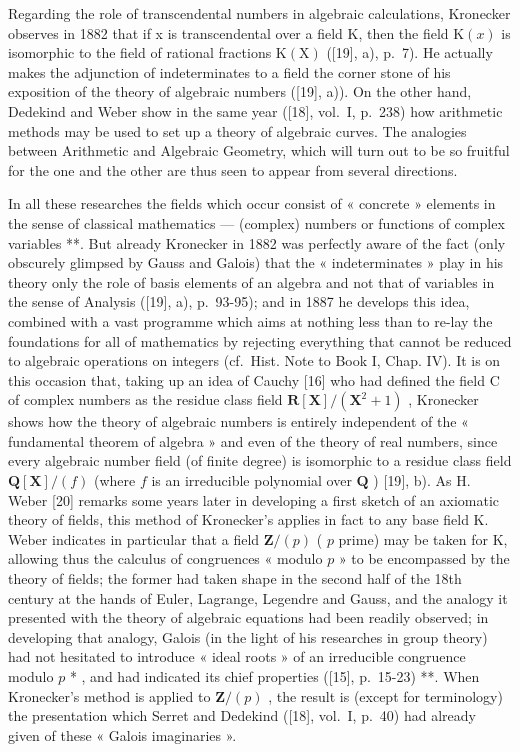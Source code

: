 Regarding the role of transcendental numbers in algebraic calculations, Kronecker observes in 1882 that if x is transcendental over a field K, then the field \(\mathrm{K}(x)\) is isomorphic to the field of rational fractions \(\mathrm{K}(\mathrm{X})\) ({[}19{]}, a), p.~7). He actually makes the adjunction of indeterminates to a field the corner stone of his exposition of the theory of algebraic numbers ({[}19{]}, a)). On the other hand, Dedekind and Weber show in the same year ({[}18{]}, vol.~I, p.~238) how arithmetic methods may be used to set up a theory of algebraic curves. The analogies between Arithmetic and Algebraic Geometry, which will turn out to be so fruitful for the one and the other are thus seen to appear from several directions.

In all these researches the fields which occur consist of « concrete » elements in the sense of classical mathematics --- (complex) numbers or functions of complex variables **. But already Kronecker in 1882 was perfectly aware of the fact (only obscurely glimpsed by Gauss and Galois) that the « indeterminates » play in his theory only the role of basis elements of an algebra and not that of variables in the sense of Analysis ({[}19{]}, a), p.~93-95); and in 1887 he develops this idea, combined with a vast programme which aims at nothing less than to re-lay the foundations for all of mathematics by rejecting everything that cannot be reduced to algebraic operations on integers (cf.~Hist. Note to Book I, Chap. IV). It is on this occasion that, taking up an idea of Cauchy {[}16{]} who had defined the field C of complex numbers as the residue class field \(\mathbf{R}[\mathbf{X}] / (\mathbf{X}^2 + 1)\) , Kronecker shows how the theory of algebraic numbers is entirely independent of the « fundamental theorem of algebra » and even of the theory of real numbers, since every algebraic number field (of finite degree) is isomorphic to a residue class field \(\mathbf{Q}[\mathbf{X}] / (f)\) (where \(f\) is an irreducible polynomial over \(\mathbf{Q}\) ) {[}19{]}, b). As H. Weber {[}20{]} remarks some years later in developing a first sketch of an axiomatic theory of fields, this method of Kronecker's applies in fact to any base field K. Weber indicates in particular that a field \(\mathbf{Z}/(p)\) ( \(p\) prime) may be taken for K, allowing thus the calculus of congruences « modulo \(p\) » to be encompassed by the theory of fields; the former had taken shape in the second half of the 18th century at the hands of Euler, Lagrange, Legendre and Gauss, and the analogy it presented with the theory of algebraic equations had been readily observed; in developing that analogy, Galois (in the light of his researches in group theory) had not hesitated to introduce « ideal roots » of an irreducible congruence modulo \(p\) * , and had indicated its chief properties ({[}15{]}, p.~15-23) **. When Kronecker's method is applied to \(\mathbf{Z}/(p)\) , the result is (except for terminology) the presentation which Serret and Dedekind ({[}18{]}, vol.~I, p.~40) had already given of these « Galois imaginaries ».

